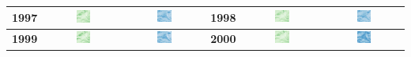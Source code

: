 \begin{longtable}{|c|c|c|c|c|c|}
    \textbf{1997} & \includegraphics[width=0.2\textwidth]{img_sat/NDVI_1997.png} & \includegraphics[width=0.2\textwidth]{img_sat/NSI_1997.png} &
    \textbf{1998} & \includegraphics[width=0.2\textwidth]{img_sat/NDVI_1998.png} & \includegraphics[width=0.2\textwidth]{img_sat/NSI_1998.png} \\
    \hline
    

    \textbf{1999} & \includegraphics[width=0.2\textwidth]{img_sat/NDVI_1999.png} & \includegraphics[width=0.2\textwidth]{img_sat/NSI_1999.png} &
    \textbf{2000} & \includegraphics[width=0.2\textwidth]{img_sat/NDVI_2000.png} & \includegraphics[width=0.2\textwidth]{img_sat/NSI_2000.png} \\
    \hline
    


\end{longtable}
